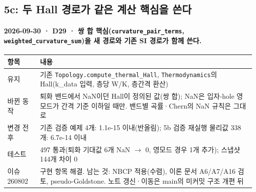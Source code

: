 \subsection{5c: 두 Hall 경로가 같은 계산 핵심을 쓴다}\label{stage5c}
\begingroup%
  \framesubtitle{2026-09-30 · D29 · 쌍 합 핵심(\texttt{curvature\_pair\_terms}, \texttt{weighted\_curvature\_sum})을 새 경로와 기존 SI 경로가 함께 쓴다.}
  \footnotesize\renewcommand{\arraystretch}{1.08}
  \begin{tabularx}{\textwidth}{@{}P{3.2cm}Y@{}}
    \toprule
    항목 & 내용 \\
    \midrule
    유지 & 기존 \texttt{Topology.compute\_thermal\_Hall}, \texttt{Thermodynamics}의 Hall(k\_data 입력, 층당 W/K, 층간격 환산) \\
    바뀐 동작 & 퇴화 밴드에서 NaN이던 Hall이 정의된 값(쌍 합); NaN은 입자-hole 영모드가 간격 기준 이하일 때만. 밴드별 곡률·Chern의 NaN 규칙은 그대로 \\
    변경 전후 & 기존 검증 예제 4개: 1.1e-15 이내(반올림); 5b 검증 재실행 물리값 338개: 6.7e-14 이내 \\
    테스트 & 497 통과(퇴화 기대값 6개 NaN $\to$ 0, 영모드 경우 1개 추가); 스냅샷 144개 차이 0 \\
    이슈 260802 & 구현 항목 해결. 남는 것: NBCP 적용(수렴), 이론 문서 A6/A7/A16 검토, pseudo-Goldstone. 노트 갱신·이동은 main의 미커밋 구조 개편 뒤 \\
    \bottomrule
  \end{tabularx}
  \par\smallskip
\endgroup


